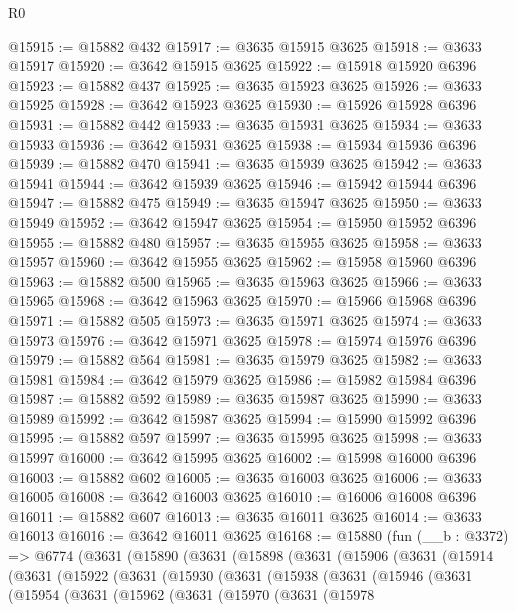 \begin{lexlean}{R0}
\begin{coremodule}
@15915 := @15882 @432
@15917 := @3635 @15915 @3625
@15918 := @3633 @15917
@15920 := @3642 @15915 @3625
@15922 := @15918 @15920 @6396
@15923 := @15882 @437
@15925 := @3635 @15923 @3625
@15926 := @3633 @15925
@15928 := @3642 @15923 @3625
@15930 := @15926 @15928 @6396
@15931 := @15882 @442
@15933 := @3635 @15931 @3625
@15934 := @3633 @15933
@15936 := @3642 @15931 @3625
@15938 := @15934 @15936 @6396
@15939 := @15882 @470
@15941 := @3635 @15939 @3625
@15942 := @3633 @15941
@15944 := @3642 @15939 @3625
@15946 := @15942 @15944 @6396
@15947 := @15882 @475
@15949 := @3635 @15947 @3625
@15950 := @3633 @15949
@15952 := @3642 @15947 @3625
@15954 := @15950 @15952 @6396
@15955 := @15882 @480
@15957 := @3635 @15955 @3625
@15958 := @3633 @15957
@15960 := @3642 @15955 @3625
@15962 := @15958 @15960 @6396
@15963 := @15882 @500
@15965 := @3635 @15963 @3625
@15966 := @3633 @15965
@15968 := @3642 @15963 @3625
@15970 := @15966 @15968 @6396
@15971 := @15882 @505
@15973 := @3635 @15971 @3625
@15974 := @3633 @15973
@15976 := @3642 @15971 @3625
@15978 := @15974 @15976 @6396
@15979 := @15882 @564
@15981 := @3635 @15979 @3625
@15982 := @3633 @15981
@15984 := @3642 @15979 @3625
@15986 := @15982 @15984 @6396
@15987 := @15882 @592
@15989 := @3635 @15987 @3625
@15990 := @3633 @15989
@15992 := @3642 @15987 @3625
@15994 := @15990 @15992 @6396
@15995 := @15882 @597
@15997 := @3635 @15995 @3625
@15998 := @3633 @15997
@16000 := @3642 @15995 @3625
@16002 := @15998 @16000 @6396
@16003 := @15882 @602
@16005 := @3635 @16003 @3625
@16006 := @3633 @16005
@16008 := @3642 @16003 @3625
@16010 := @16006 @16008 @6396
@16011 := @15882 @607
@16013 := @3635 @16011 @3625
@16014 := @3633 @16013
@16016 := @3642 @16011 @3625
@16168 := @15880
    (fun (__b : @3372) =>
    @6774
      (@3631
        (@15890
          (@3631
            (@15898
              (@3631
                (@15906
                  (@3631
                    (@15914
                      (@3631
                        (@15922
                          (@3631
                            (@15930
                              (@3631
                                (@15938
                                  (@3631
                                    (@15946
                                      (@3631
                                        (@15954
                                          (@3631
                                            (@15962
                                              (@3631
                                                (@15970
                                                  (@3631
                                                    (@15978

\end{coremodule}
\end{lexlean}
